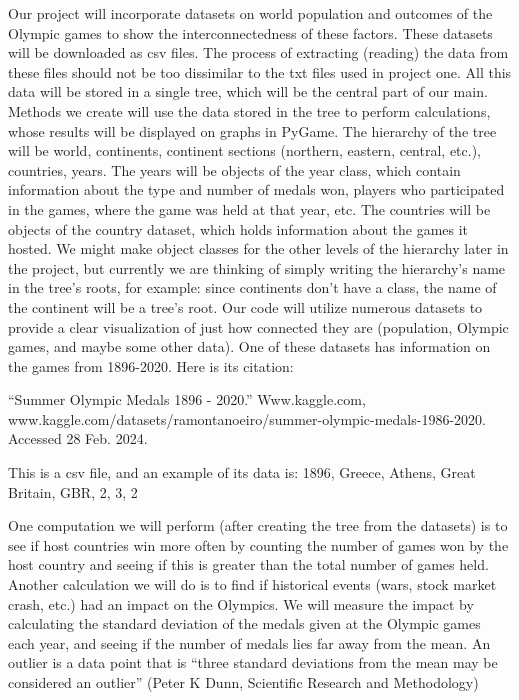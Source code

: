 \documentclass[fontsize=11pt]{article}
\begin{document}
Our project will incorporate datasets on world population and outcomes of the Olympic games to show the interconnectedness of these factors. These datasets will be downloaded as csv files. The process of extracting (reading) the data from these files should not be too dissimilar to the txt files used in project one. All this data will be stored in a single tree, which will be the central part of our main. Methods we create will use the data stored in the tree to perform calculations, whose results will be displayed on graphs in PyGame. The hierarchy of the tree will be world, continents, continent sections (northern, eastern, central, etc.), countries, years. The years will be objects of the year class, which contain information about the type and number of medals won, players who participated in the games, where the game was held at that year, etc. The countries will be objects of the country dataset, which holds information about the games it hosted. We might make object classes for the other levels of the hierarchy later in the project, but currently we are thinking of simply writing the hierarchy's name in the tree's roots, for example: since continents don't have a class, the name of the continent will be a tree's root. Our code will utilize numerous datasets to provide a clear visualization of just how connected they are (population, Olympic games, and maybe some other data). One of these datasets has information on the games from 1896-2020. Here is its citation: 

  

“Summer Olympic Medals 1896 - 2020.” Www.kaggle.com, www.kaggle.com/datasets/ramontanoeiro/summer-olympic-medals-1986-2020. Accessed 28 Feb. 2024. 

  

This is a csv file, and an example of its data is: 1896, Greece, Athens, Great Britain, GBR, 2, 3, 2 

  

One computation we will perform (after creating the tree from the datasets) is to see if host countries win more often by counting the number of games won by the host country and seeing if this is greater than the total number of games held. Another calculation we will do is to find if historical events (wars, stock market crash, etc.) had an impact on the Olympics. We will measure the impact by calculating the standard deviation of the medals given at the Olympic games each year, and seeing if the number of medals lies far away from the mean. An outlier is a data point that is “three standard deviations from the mean may be considered an outlier” (Peter K Dunn, Scientific Research and Methodology) 
\end{document}
